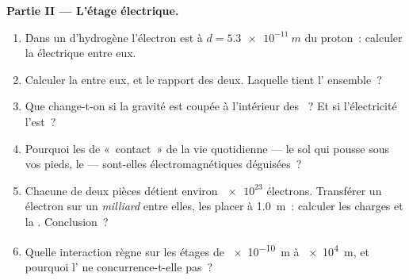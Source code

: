 \begin{problem}
\medskip
\noindent\textbf{Partie II --- L'étage électrique.}
\begin{enumerate}[resume]
  \item Dans un  d'hydrogène l'électron
        est à $d = \qty{5.3e-11}{m}$ du proton~: calculer la
         électrique entre eux.
  \item Calculer la 
        entre eux, et le rapport des deux. Laquelle tient l'
         ensemble~?
  \item Que change-t-on si la gravité est coupée à l'intérieur des
        ~? Et si l'électricité
        l'est~?
  \item Pourquoi les  de «~contact~» de la
        vie quotidienne --- le sol qui pousse sous vos pieds, le
         --- sont-elles
        électromagnétiques déguisées~?
  \item Chacune de deux pièces détient environ $\num{e23}$ électrons.
        Transférer un électron sur un \emph{milliard} entre elles, les
        placer à \qty{1.0}{m}~: calculer les charges et la
        . Conclusion~?
  \item Quelle interaction règne sur les étages de \qty{e-10}{m} à
        \qty{e4}{m}, et pourquoi l' ne concurrence-t-elle pas~?
\end{enumerate}


\end{problem}
